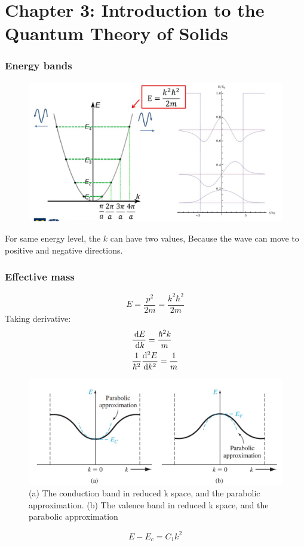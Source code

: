 \documentclass{beamer}
\begin{document}
\section{Chapter 3: Introduction to the Quantum Theory of Solids}
    \begin{frame} \frametitle{Energy bands}
        \begin{figure}[H]
            \centering
            \includegraphics[width=0.6\linewidth]{Energy_bands.jpg}
            \label{fig:Energy_bands.jpg}
        \end{figure}
        \par For same energy level, the $k$ can have two values, Because the wave can move to positive and negative directions.
    \end{frame}

    \begin{frame} \frametitle{Effective mass}
        \begin{equation*}
            E = \frac{p^2}{2m} = \frac{k^2 \hbar^2}{2m} 
        \end{equation*}
        Taking derivative:
        \begin{equation*}
            \begin{aligned}
                & \frac{\: \mathrm{d} E}{\: \mathrm{d} k} = \frac{\hbar^2 k}{m} \\
                & \frac{1}{\hbar^2} \frac{\mathrm{d}^2 E}{\mathrm{d} k^2} = \frac{1}{m} 
            \end{aligned}
        \end{equation*}

        \begin{figure}[H]
            \vspace{-0.5em}
            \centering
            \includegraphics[width=0.7\linewidth]{Effective-mass.jpg}
            \caption{\tiny (a) The conduction band in reduced k space, and the parabolic approximation. (b) The valence band in reduced k space, and the parabolic approximation}
            \label{fig:Effective-mass.jpg}
            \vspace{-0.5em}
        \end{figure}
        \begin{equation*}
            E - E_c = C_1 k^2
        \end{equation*}
    \end{frame}
\end{document}
